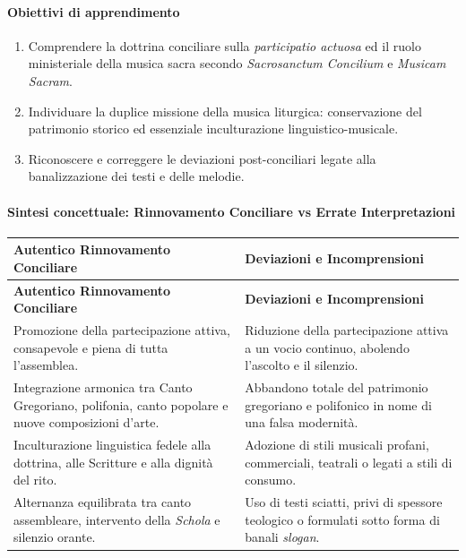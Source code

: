 \documentclass[12pt,a4paper]{article}
\begin{document}
	\paragraph{Obiettivi di apprendimento}\label{obiettivi-di-apprendimento-2}
	
	\begin{enumerate}[label=\arabic*.,leftmargin=*]
		\item Comprendere la dottrina conciliare sulla \emph{participatio actuosa} ed il ruolo ministeriale della musica sacra secondo \emph{Sacrosanctum Concilium} e \emph{Musicam Sacram}.
		\item Individuare la duplice missione della musica liturgica: conservazione del patrimonio storico ed essenziale inculturazione linguistico-musicale.
		\item Riconoscere e correggere le deviazioni post-conciliari legate alla banalizzazione dei testi e delle melodie.
	\end{enumerate}
	
	\paragraph{Sintesi concettuale: Rinnovamento Conciliare vs Errate Interpretazioni}\label{sintesi-concettuale-rinnovamento-conciliare-vs-errate-interpretazioni}
	
	\begin{longtable}{L{7cm}L{7cm}}
		\toprule
		\textbf{Autentico Rinnovamento Conciliare} & \textbf{Deviazioni e Incomprensioni} \\
		\midrule
		\endfirsthead
		\toprule
		\textbf{Autentico Rinnovamento Conciliare} & \textbf{Deviazioni e Incomprensioni} \\
		\midrule
		\endhead
		\bottomrule
		\endlastfoot
		Promozione della partecipazione attiva, consapevole e piena di tutta l'assemblea. & Riduzione della partecipazione attiva a un vocio continuo, abolendo l'ascolto e il silenzio. \\
		Integrazione armonica tra Canto Gregoriano, polifonia, canto popolare e nuove composizioni d'arte. & Abbandono totale del patrimonio gregoriano e polifonico in nome di una falsa modernità. \\
		Inculturazione linguistica fedele alla dottrina, alle Scritture e alla dignità del rito. & Adozione di stili musicali profani, commerciali, teatrali o legati a stili di consumo. \\
		Alternanza equilibrata tra canto assembleare, intervento della \emph{Schola} e silenzio orante. & Uso di testi sciatti, privi di spessore teologico o formulati sotto forma di banali \emph{slogan}. \\
	\end{longtable}
	
\end{document}
